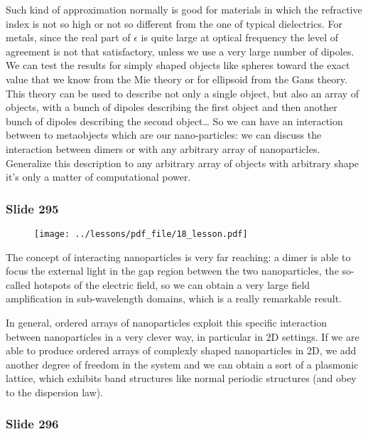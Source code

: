 \documentclass[../main/main.tex]{subfiles}
\begin{document}
Such kind of approximation normally is good for materials in which the refractive index is not so high or not so different from the one of typical dielectrics. For metals, since the real part of $\epsilon$ is quite large at optical frequency the level of agreement is not that satisfactory, unless we use a very large number of dipoles.
We can test the results for simply shaped objects like spheres toward the exact value that we know from the Mie theory or for ellipsoid from the Gans theory.
This theory can be used to describe not only a single object, but also an array of objects, with a bunch of dipoles describing the first object and then another bunch of dipoles describing the second object… So we can have an interaction between to metaobjects which are our nano-particles: we can discuss the interaction between dimers or with any arbitrary array of nanoparticles.
Generalize this description to any arbitrary array of objects with arbitrary shape it’s only a matter of computational power.

\newpage

\subsubsection{Slide 295}

\begin{figure}[h!]
\centering
\texttt{[image: ../lessons/pdf\_file/18\_lesson.pdf]}
\end{figure}

The concept of interacting nanoparticles is very far reaching: a dimer is able to focus the external light in the gap region between the two nanoparticles, the so-called hotspots of the electric field, so we can obtain a very large field amplification in sub-wavelength domains, which is a really remarkable result.

In general, ordered arrays of nanoparticles exploit this specific interaction between nanoparticles in a very clever way, in particular in 2D settings.
If we are able to produce ordered arrays of complexly shaped nanoparticles in 2D, we add another degree of freedom in the system and we can obtain a sort of a plasmonic lattice, which exhibits band structures like normal periodic structures (and obey to the dispersion law). 

\newpage

\subsubsection{Slide 296}
\end{document}
